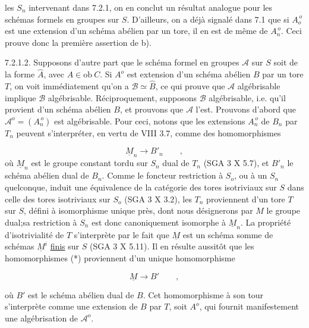 
les $S_n$ intervenant dans 7.2.1, on en conclut un résultat analogue pour les schémas formels en groupes sur $S$. D'ailleurs, on a déjà signalé dans 7.1 que si $A_o^{\,o}$ est une extension d'un schéma abélien par un tore, il en est de même de $A_n^{\,o}$. Ceci prouve donc la première assertion de b).

7.2.1.2. Supposons d'autre part que le schéma formel en groupes $\mathcal{A}$ sur $S$ soit de la forme $\hat{A}$, avec $A \in \mathrm{ob}\ C$. Si $A^o$ est extension d'un schéma abélien $B$ par un tore $T$, on voit immédiatement qu'on a $\mathcal{B} \simeq \hat{B}$, ce qui prouve que $\mathcal{A}$ algébrisable implique $\mathcal{B}$ algébrisable. Réciproquement, supposons $\mathcal{B}$ algébrisable, i.e. qu'il provient d'un schéma abélien $B$, et prouvons que $\mathcal{A}$ l'est. Prouvons d'abord que $\mathcal{A}^o = (A_n^{\,o})$ est algébrisable. Pour ceci, notons que les extensions $A_n^{\,o}$ de $B_n$ par $T_n$ peuvent s'interpréter, en vertu de VIII 3.7, comme des homomorphismes

\begin{equation}\tag{*}
\underline{M}_n \longrightarrow B'_n \qquad ,
\end{equation}
où $\underline{M}_n$ est le groupe constant tordu sur $S_n$ dual de $T_n$ (SGA 3 X 5.7), et $B'_n$ le schéma abélien dual de $B_n$. Comme le foncteur restriction à $S_o$, ou à un $S_n$ quelconque, induit une équivalence de la catégorie des tores isotriviaux sur $S$ dans celle des tores isotriviaux sur $S_o$ (SGA 3 X 3.2), les $T_n$ proviennent d'un tore $T$ sur $S$, défini à isomorphisme unique près, dont nous désignerons par $M$ le groupe dual;sa restriction à $S_n$ est donc canoniquement isomorphe à $\underline{M}_n$. La propriété d'isotrivialité de $T$ s'interprète par le fait que $\underline{M}$ est un schéma somme de schémas $\underline{M}^i$ \underline{finis} sur $S$ (SGA 3 X 5.11). Il en résulte aussitôt que les homomorphismes (*) proviennent d'un unique homomorphisme

\begin{equation}\tag{**}
\underline{M} \longrightarrow B' \qquad ,
\end{equation}


où $B'$ est le schéma abélien dual de $B$. Cet homomorphisme à son tour s'interprète comme une extension de $B$ par $T$, soit $A^{o}$, qui fournit manifestement une algébrisation de $\mathcal{A}^{o}$.


